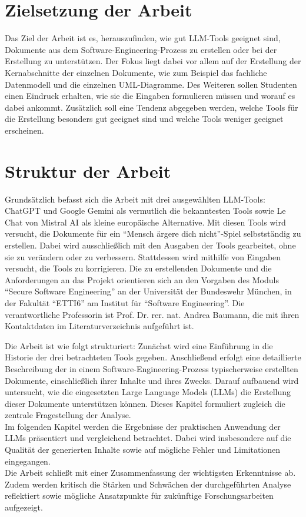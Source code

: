 \section{Zielsetzung der Arbeit}  \label{Zielsetzung der Arbeit}

Das Ziel der Arbeit ist es, herauszufinden, wie gut LLM-Tools geeignet sind, Dokumente aus dem Software-Engineering-Prozess zu 
erstellen oder bei der Erstellung zu unterstützen. Der Fokus liegt dabei vor allem auf der Erstellung der Kernabschnitte der 
einzelnen Dokumente, wie zum Beispiel das fachliche Datenmodell und die einzelnen UML-Diagramme. Des Weiteren sollen Studenten 
einen Eindruck erhalten, wie sie die Eingaben formulieren müssen und worauf es dabei ankommt. Zusätzlich soll eine Tendenz 
abgegeben werden, welche Tools für die Erstellung besonders gut geeignet sind und welche Tools weniger geeignet erscheinen. 

\section{Struktur der Arbeit}  \label{Struktur der Arbeit}

Grundsätzlich befasst sich die Arbeit mit drei ausgewählten LLM-Tools: ChatGPT und Google Gemini als vermutlich die 
bekanntesten Tools sowie Le Chat von Mistral AI als kleine europäische Alternative. Mit diesen Tools wird versucht, 
die Dokumente für ein ``Mensch ärgere dich nicht''-Spiel selbstständig zu erstellen. Dabei wird ausschließlich mit den 
Ausgaben der Tools gearbeitet, ohne sie zu verändern oder zu verbessern. Stattdessen wird mithilfe von Eingaben 
versucht, die Tools zu korrigieren. Die zu erstellenden Dokumente und die Anforderungen an das Projekt orientieren 
sich an den Vorgaben des Moduls ``Secure Software Engineering'' an der Universität der Bundeswehr München, in der 
Fakultät ``ETTI6'' am Institut für ``Software Engineering''. Die verantwortliche Professorin ist Prof. Dr. rer. nat. Andrea Baumann, 
die mit ihren Kontaktdaten im Literaturverzeichnis aufgeführt ist.

Die Arbeit ist wie folgt strukturiert: Zunächst wird eine Einführung in die Historie der drei betrachteten Tools gegeben. 
Anschließend erfolgt eine detaillierte Beschreibung der in einem Software-Engineering-Prozess typischerweise erstellten 
Dokumente, einschließlich ihrer Inhalte und ihres Zwecks. Darauf aufbauend wird untersucht, wie die eingesetzten Large 
Language Models (LLMs) die Erstellung dieser Dokumente unterstützen können. Dieses Kapitel formuliert zugleich die 
zentrale Fragestellung der Analyse.\\
Im folgenden Kapitel werden die Ergebnisse der praktischen Anwendung der LLMs präsentiert und vergleichend betrachtet. 
Dabei wird insbesondere auf die Qualität der generierten Inhalte sowie auf mögliche Fehler und Limitationen eingegangen.\\
Die Arbeit schließt mit einer Zusammenfassung der wichtigsten Erkenntnisse ab. Zudem werden kritisch die Stärken und 
Schwächen der durchgeführten Analyse reflektiert sowie mögliche Ansatzpunkte für zukünftige Forschungsarbeiten aufgezeigt.


